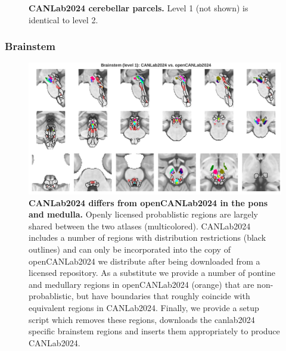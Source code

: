 \documentclass[10pt,letterpaper]{article}
\begin{document}
\begin{figure}[t]
\begin{minipage}{\linewidth}
\end{minipage}
\caption{
{\bf
CANLab2024 cerebellar parcels.} Level 1 (not shown) is identical to level 2.
}
\label{cblm-granularities-figure}
\end{figure}

\subsubsection{Brainstem}


\begin{figure}[t!]
\centering
\includegraphics[width=\linewidth]{images/bstem_canlab_vs_opencanlab.png}
\caption{
{\bf
CANLab2024 differs from openCANLab2024 in the pons and medulla.} 
Openly licensed probablistic regions are largely shared between the two atlases (multicolored). CANLab2024 includes a number of regions with distribution restrictions (black outlines) and can only be incorporated into the copy of openCANLab2024 we distribute after being downloaded from a licensed repository. As a substitute we provide a number of pontine and medullary regions in openCANLab2024 (orange) that are non-probablistic, but have boundaries that roughly coincide with equivalent regions in CANLab2024. Finally, we provide a setup script which removes these regions, downloads the canlab2024 specific brainstem regions and inserts them appropriately to produce CANLab2024.}
\label{canlab2024-vs-opencanlab2024-bstem-figure}
\end{figure}
\end{document}
